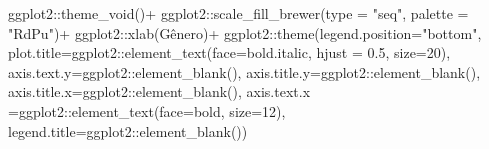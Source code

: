 \documentclass[
]{article}
\newenvironment{Shaded}{\begin{snugshade}}{\end{snugshade}}
\newcommand{\AttributeTok}[1]{\textcolor[rgb]{0.77,0.63,0.00}{#1}}
\newcommand{\DecValTok}[1]{\textcolor[rgb]{0.00,0.00,0.81}{#1}}
\newcommand{\FloatTok}[1]{\textcolor[rgb]{0.00,0.00,0.81}{#1}}
\newcommand{\FunctionTok}[1]{\textcolor[rgb]{0.00,0.00,0.00}{#1}}
\newcommand{\NormalTok}[1]{#1}
\newcommand{\SpecialCharTok}[1]{\textcolor[rgb]{0.00,0.00,0.00}{#1}}
\newcommand{\StringTok}[1]{\textcolor[rgb]{0.31,0.60,0.02}{#1}}
\begin{document}
\begin{Shaded}
\begin{Highlighting}[]
\NormalTok{  ggplot2}\SpecialCharTok{::}\FunctionTok{theme\_void}\NormalTok{()}\SpecialCharTok{+}
\NormalTok{  ggplot2}\SpecialCharTok{::}\FunctionTok{scale\_fill\_brewer}\NormalTok{(}\AttributeTok{type =} \StringTok{"seq"}\NormalTok{, }\AttributeTok{palette =} \StringTok{"RdPu"}\NormalTok{)}\SpecialCharTok{+}
\NormalTok{  ggplot2}\SpecialCharTok{::}\FunctionTok{xlab}\NormalTok{(}\StringTok{\textquotesingle{}Gênero\textquotesingle{}}\NormalTok{)}\SpecialCharTok{+}
\NormalTok{  ggplot2}\SpecialCharTok{::}\FunctionTok{theme}\NormalTok{(}\AttributeTok{legend.position=}\StringTok{"bottom"}\NormalTok{,}
                 \AttributeTok{plot.title=}\NormalTok{ggplot2}\SpecialCharTok{::}\FunctionTok{element\_text}\NormalTok{(}\AttributeTok{face=}\StringTok{\textquotesingle{}bold.italic\textquotesingle{}}\NormalTok{,}
                                                  \AttributeTok{hjust =} \FloatTok{0.5}\NormalTok{, }\AttributeTok{size=}\DecValTok{20}\NormalTok{),}
                 \AttributeTok{axis.text.y=}\NormalTok{ggplot2}\SpecialCharTok{::}\FunctionTok{element\_blank}\NormalTok{(),}
                 \AttributeTok{axis.title.y=}\NormalTok{ggplot2}\SpecialCharTok{::}\FunctionTok{element\_blank}\NormalTok{(),}
                 \AttributeTok{axis.title.x=}\NormalTok{ggplot2}\SpecialCharTok{::}\FunctionTok{element\_blank}\NormalTok{(),}
                 \AttributeTok{axis.text.x =}\NormalTok{ggplot2}\SpecialCharTok{::}\FunctionTok{element\_text}\NormalTok{(}\AttributeTok{face=}\StringTok{\textquotesingle{}bold\textquotesingle{}}\NormalTok{, }\AttributeTok{size=}\DecValTok{12}\NormalTok{),}
                 \AttributeTok{legend.title=}\NormalTok{ggplot2}\SpecialCharTok{::}\FunctionTok{element\_blank}\NormalTok{())}


\end{Highlighting}
\end{Shaded}
\end{document}
